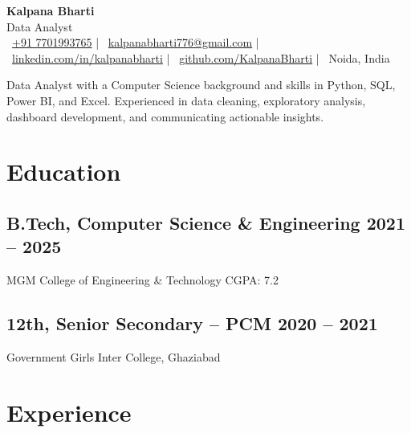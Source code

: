 \documentclass[a4paper,10pt]{article}
\begin{document}
\begin{center}
    {\fontsize{30}{32}\selectfont\textbf{Kalpana Bharti}}\\[1pt]
    {\fontsize{13}{15}\selectfont\color{UI_blue}Data Analyst}\\[5pt]
    {\fontsize{8.5}{10}\selectfont
    \faPhone\ \textcolor{UI_blue}{\href{tel:+917701993765}{+91 7701993765}}\quad
    \textcolor{UI_blue}{|}\quad
    \faEnvelope\ \textcolor{UI_blue}{\href{mailto:kalpanabharti776@gmail.com}{kalpanabharti776@gmail.com}}\quad
    \textcolor{UI_blue}{|}\quad
    \faLinkedin\ \textcolor{UI_blue}{\href{https://linkedin.com/in/kalpanabharti}{linkedin.com/in/kalpanabharti}}\quad
    \textcolor{UI_blue}{|}\quad
    \faGithub\ \textcolor{UI_blue}{\href{https://github.com/KalpanaBharti}{github.com/KalpanaBharti}}\quad
    \textcolor{UI_blue}{|}\quad
    \faMapMarker\ \textcolor{UI_blue}{Noida, India}
    }
\end{center}
\vspace{-0.22cm}
{\color{UI_blue}\hrulefill}
\vspace{0.02cm}

\noindent Data Analyst with a Computer Science background and skills in Python, SQL, Power BI, and Excel. Experienced in data cleaning, exploratory analysis, dashboard development, and communicating actionable insights.

\section{Education}
\subsection*{B.Tech, Computer Science \& Engineering \hfill 2021 -- 2025}
MGM College of Engineering \& Technology \hfill CGPA: 7.2
\vspace{0.08cm}

\subsection*{12th, Senior Secondary -- PCM \hfill 2020 -- 2021}
Government Girls Inter College, Ghaziabad

\section{Experience}
\end{document}
